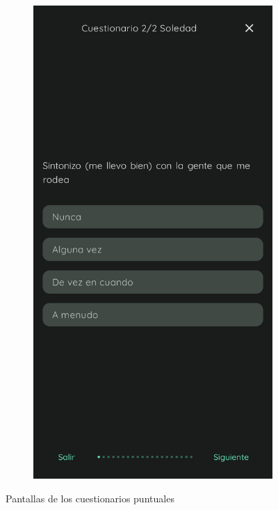 \begin{figure}[htbp]
\begin{subfigure}[c]{0.29\textwidth}
                		\includegraphics[width=1\linewidth]{figures/pantallas/Soledad puntual.png}
                	\end{subfigure}
                	\caption{Pantallas de los cuestionarios puntuales}
                	\label{figure:implementacion:pantalla:puntuales}
                \end{figure}
                
